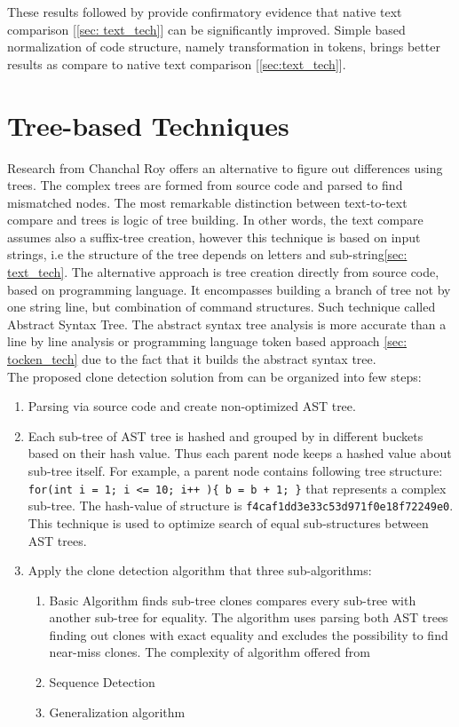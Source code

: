\documentclass{report}
\begin{document}
These results followed by \cite{tocken_kamiya} provide confirmatory evidence that native text comparison [\ref{sec: text_tech}] can be significantly improved. Simple based normalization of code structure, namely transformation in tokens,  brings better results as compare to native text comparison [\ref{sec:text_tech}]. 


\section{Tree-based Techniques}
\label{sec: tree_tech}
Research from Chanchal Roy \cite{software_clone_detection} offers an alternative to figure out differences using trees. The complex trees are formed from source code and parsed to find mismatched nodes. The most remarkable distinction between text-to-text compare and trees is logic of tree building. In other words, the text compare assumes also a suffix-tree creation, however this technique is based on input strings, i.e the structure of the tree depends on letters and sub-string\ref{sec: text_tech}. The alternative approach is tree creation directly from source code, based on programming language. It encompasses building a branch of tree not by one string line, but combination of command structures. Such technique called Abstract Syntax Tree. The abstract syntax tree analysis is more accurate than a line by line analysis or programming language token based approach \ref{sec: tocken_tech} due to the fact that it builds the abstract syntax tree.\\
The proposed clone detection solution from \cite{flavius} can be organized into few steps:
\begin{enumerate}
	\item Parsing via source code and create non-optimized AST tree.
	\item Each sub-tree of AST tree is hashed and grouped by in different buckets based on their hash value. Thus each parent node keeps a hashed value about sub-tree itself. For example, a parent node contains following tree structure: \texttt{for(int i = 1; i <= 10; i++ )\{ b = b + 1; \}} that represents a complex sub-tree. The hash-value of structure is \texttt{f4caf1dd3e33c53d971f0e18f72249e0}. This technique is used to optimize search of equal sub-structures between AST trees.
	\item Apply the clone detection algorithm that three sub-algorithms:
		\begin{enumerate}[label*=\arabic*.]
		\item Basic Algorithm finds sub-tree clones compares every sub-tree with another sub-tree for equality. The algorithm uses parsing both AST trees finding out clones with exact equality and excludes the possibility to find near-miss clones. The complexity of algorithm offered from 
		\item Sequence Detection
		\item Generalization algorithm
		 \end{enumerate} 
\end{enumerate}
\end{document}
